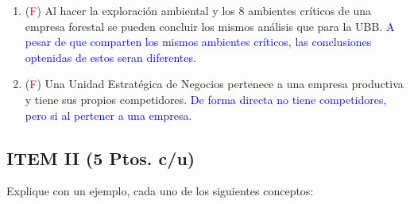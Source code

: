 \documentclass{templateNote}
\begin{document}
\begin{enumerate}
    \item (\textcolor{red}{F}) Al hacer la exploración ambiental y los 8 ambientes críticos de una empresa forestal se pueden concluir los mismos análisis que para la UBB.\newline
    \textcolor{blue}{
        A pesar de que comparten los mismos ambientes críticos, las conclusiones optenidas de estos seran diferentes.
    }
    
    \item (\textcolor{red}{F}) Una Unidad Estratégica de Negocios pertenece a una empresa productiva y tiene sus propios competidores.\newline
    \textcolor{blue}{
        De forma directa no tiene competidores, pero si al pertener a una empresa.
    }
\end{enumerate}

\newpage
\subsection*{ITEM II (5 Ptos. c/u)}
Explique con un ejemplo, cada uno de los siguientes conceptos: 
\end{document}

